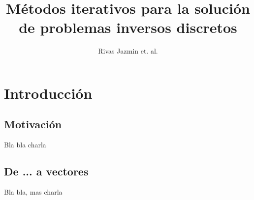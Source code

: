 \documentclass[12pt, oneside]{book}
\title{Métodos iterativos para la solución de problemas inversos discretos}
\author{Rivas Jazmin et. al.}
\date{}
\begin{document}
	\maketitle
	\tableofcontents
	
	
	\chapter{Introducción}
	
	\section{Motivación}
	Bla bla charla
	\section{De ... a vectores}
	Bla bla, mas charla
	
\end{document}
